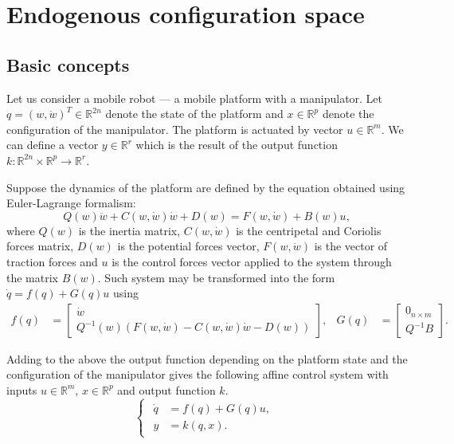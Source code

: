 \chapter{Endogenous configuration space}
\label{ch:endogen}
\section{Basic concepts}
Let us consider a mobile robot --- a mobile platform with a manipulator. Let $q = (w, \dot w)^T \in \mathbb{R}^{2n}$ denote the state of the platform and $x \in \mathbb{R}^p$ denote the configuration of the manipulator. The platform is actuated by vector $u \in \mathbb{R}^m$. We can define a vector $y \in \mathbb{R}^r$ which is the result of the output function $k: \mathbb{R}^{2n} \times \mathbb{R}^p \rightarrow \mathbb{R}^r$. 

Suppose the dynamics of the platform are defined by the equation obtained using Euler-Lagrange formalism:
\begin{equation}
Q(w)\ddot w + C(w, \dot{w})\dot{w}+D(w)=F(w, \dot w)+B(w)u,
\end{equation}
where $Q(w)$ is the inertia matrix, $C(w, \dot w)$ is the centripetal and Coriolis forces matrix,
$D(w)$ is the potential forces vector, $F(w, \dot w)$ is the vector of traction forces and $u$ is the
control forces vector applied to the system through the matrix $B(w)$.
Such system may be transformed into the form $\dot q = f(q) + G(q)u$ using
\begin{equation}
\begin{aligned}
f(q)&=\begin{bmatrix}
\dot{w}\\
Q^{-1}(w)\left(F(w, \dot w)-C(w, \dot{w})\dot{w}-D(w)\right)
\end{bmatrix}, & G(q)&=\begin{bmatrix}
0_{n\times m}\\
Q^{-1}B
\end{bmatrix}.
\end{aligned}
\end{equation}

Adding to the above the output function depending on the platform state and the configuration of the manipulator gives the following affine control system with inputs
$u \in \mathbb{R}^m$, $x \in \mathbb{R}^p$ and output function $k$.
\begin{equation}
\begin{cases}
\begin{aligned}
\label{eq:control_sys}
\dot q &= f(q) + G(q)u,\\
y &= k(q, x).
\end{aligned}
\end{cases}
\end{equation}

